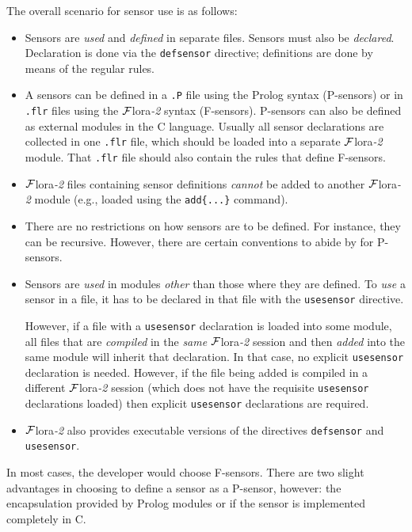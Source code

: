 \documentclass[11pt]{article}
\newcommand{\FLSYSTEM}{{\mbox{\sc ${\cal F}${lora}\rm\emph{-2}}}\xspace}
\newcommand{\flrext}{flr}
\begin{document}
The overall scenario for sensor use is as follows:
\begin{itemize}
\item  Sensors are \emph{used} and \emph{defined} in separate files.
  Sensors must also be \emph{declared}. 
  Declaration is done via the
  \texttt{defsensor} directive; definitions are done by means of the
  regular rules.
\item
  A sensors can be defined in a \texttt{.P} file
  using the Prolog syntax (P-sensors)  or in
  \texttt{.\flrext} files using the \FLSYSTEM syntax (F-sensors). 
  P-sensors can also be defined as external modules in the C language.
  Usually all sensor declarations are collected in one \texttt{.\flrext}
  file, which should be loaded into a separate \FLSYSTEM module. That
  \texttt{.\flrext} file 
  should also contain the rules that define F-sensors. 
\item 
  \FLSYSTEM files containing sensor definitions \emph{cannot} be added to
  another \FLSYSTEM module (e.g., loaded 
  using the \texttt{add\{...\}} command).
\item
  There are no restrictions on how sensors are to be defined. For instance,
  they can be recursive. However, there are certain conventions to abide by
  for P-sensors.
\item  Sensors are \emph{used} in modules \emph{other} than those where they
  are defined. To \emph{use} a sensor in a file, it has to be declared
  in that file with the \texttt{usesensor} directive.

  However, if a file with a \texttt{usesensor} declaration is loaded into
  some module, all
  files that are \emph{compiled} in the \emph{same} \FLSYSTEM session  
  and then \emph{added}  into the same module will inherit that declaration.
  In that case, no explicit \texttt{usesensor} declaration is needed.
  However, if the file being added is compiled in a different \FLSYSTEM
  session (which does not have the requisite \texttt{usesensor}
  declarations loaded) then explicit \texttt{usesensor} declarations are
  required.  
\item \FLSYSTEM also provides executable versions of the directives 
  \texttt{defsensor} and \texttt{usesensor}.  
\end{itemize}

In most cases, the developer would choose F-sensors. There are two slight
advantages in choosing to define a sensor as a P-sensor, however: the encapsulation
provided by Prolog modules or if the sensor is implemented completely in C.
\end{document}
